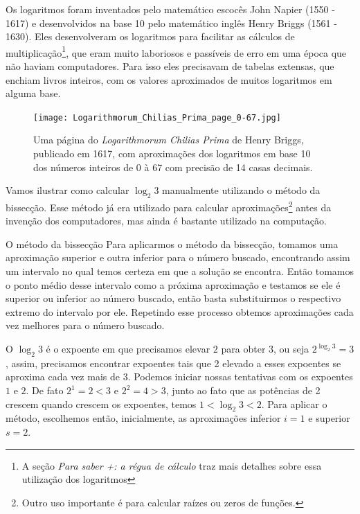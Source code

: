 

Os logaritmos foram inventados pelo matemático escocês John Napier (1550 - 1617) e desenvolvidos na base 10 pelo matemático inglês Henry Briggs (1561 - 1630). Eles desenvolveram os logaritmos para facilitar as cálculos de multiplicação\footnote{A seção \textit{Para saber +: a régua de cálculo} traz mais detalhes sobre essa utilização dos logaritmos}, que eram muito laboriosos e passíveis de erro em uma época que não haviam computadores. Para isso eles precisavam de tabelas extensas, que enchiam livros inteiros, com os valores aproximados de muitos logaritmos em alguma base.


\begin{figure}[H]
\centering
\texttt{[image: Logarithmorum\_Chilias\_Prima\_page\_0-67.jpg]}%
\caption{Uma página do \textit{Logarithmorum Chilias Prima} de Henry Briggs, publicado em 1617, com aproximações dos logaritmos em base 10 dos números inteiros de 0 à 67 com precisão de 14 casas decimais.}
\end{figure}


Vamos ilustrar como calcular $\log_2 3$ manualmente utilizando o método da bissecção. Esse método já era utilizado para calcular aproximações\footnote{Outro uso importante é para calcular raízes ou zeros de funções.} antes da invenção dos computadores, mas ainda é bastante utilizado na computação.



\begin{observation}{O método da bissecção}
Para aplicarmos o método da bissecção, tomamos uma aproximação superior e outra inferior para o número buscado, encontrando assim um intervalo no qual temos certeza em que a solução se encontra. Então tomamos o ponto médio desse intervalo como a próxima aproximação e testamos se ele é superior ou inferior ao número buscado, então basta substituirmos o respectivo extremo do intervalo por ele. Repetindo esse processo obtemos aproximações cada vez melhores para o número buscado.
\end{observation}


O $\log_2 3$ é o expoente em que precisamos elevar $2$ para obter $3$, ou seja $2^{\log_2 3} = 3$, assim, precisamos encontrar expoentes tais que 2 elevado a esses expoentes se aproxima cada vez mais de 3.  Podemos iniciar nossas tentativas com os expoentes $1$ e $2$. De fato $2^1=2<3$ e $2^2 = 4>3$, junto ao fato que as potências de 2 crescem quando crescem os expoentes, temos $1<\log_2 3 < 2$. Para aplicar o método, escolhemos então, inicialmente, as aproximações inferior $i=1$ e superior $s=2$.

